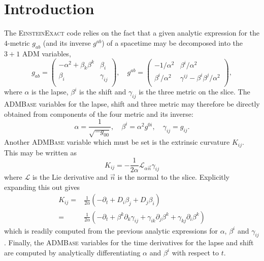 \documentclass{article}
\begin{document}
\section{Introduction}
The \textsc{EinsteinExact} code relies on the fact that a given analytic
expression for the $4$-metric $g_{ab}$ (and its inverse $g^{ab}$) of a spacetime
may be decomposed into the $3+1$ ADM variables,
\begin{equation}
g_{ab} =
\left(
\begin{array}{cc}
 -\alpha^2 + \beta_k \beta^k & \beta_i \\
 \beta_i & \gamma_{ij}\\
\end{array}
\right),\quad
g^{ab} =
\left(
\begin{array}{cc}
 -1/\alpha^2 & \beta^i / \alpha^2 \\
 \beta^i / \alpha^2 & \gamma^{ij} - \beta^i \beta^j / \alpha^2\\
\end{array}
\right),
\end{equation}
where $\alpha$ is the lapse, $\beta^i$ is the shift and $\gamma_{ij}$
is the three metric on the slice. The \textsc{ADMBase} variables for the
lapse, shift and three metric may therefore be directly obtained from
components of the four metric and its inverse:
\begin{equation}
\alpha = \frac{1}{\sqrt{-g_{00}}},\quad
\beta^i = \alpha^2 g^{0i},\quad
\gamma_{ij} = g_{ij}.
\end{equation}
Another \textsc{ADMBase} variable which must be set is the extrinsic
curvature $K_{ij}$. This may be written as
\begin{equation}
K_{ij} = -\frac{1}{2\alpha} \mathcal{L}_{\alpha \vec{n}} \gamma_{ij}
\end{equation}
where $\mathcal{L}$ is the Lie derivative and $\vec{n}$ is the normal to the
slice. Explicitly expanding this out gives
\begin{align}
K_{ij} = & \frac{1}{2\alpha} (-\partial_t + D_i \beta_j + D_j \beta_i) \nonumber \\
 = &  \frac{1}{2\alpha} (-\partial_t
        + \beta^k \partial_k \gamma_{ij}
        + \gamma_{ik} \partial_j \beta^k
        + \gamma_{kj} \partial_i \beta^k
      )
\end{align}
which is readily computed from the previous analytic expressions for $\alpha$,
$\beta^i$ and $\gamma_{ij}$. Finally, the \textsc{ADMBase} variables for the time
derivatives for the lapse and shift are computed by analytically differentiating
$\alpha$ and $\beta^i$ with respect to $t$.
\end{document}
